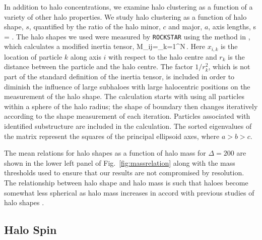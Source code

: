 \documentclass[usenatbib,fleqn]{mnras}
\begin{document}
In addition to halo concentrations, we examine halo clustering as a function of a variety of other halo properties. We study halo clustering as a function of halo shape, $s$, quantified by the ratio of the halo minor, $c$ and major, $a$, axis lengths, 
%
\beq
s = .
\eeq
%
The halo shapes we used were measured by {\tt ROCKSTAR} using the method in \cite{allgood_etal06}, which calculates a modified inertia tensor,
\beq
M_{ij}=\sum\limits_{k=1}^{N}\,.
\eeq
Here $x_{i,k}$ is the location of particle $k$ along axis $i$ with respect to the halo centre and $r_{k}$ is the distance between the particle and the halo centre. The factor $1/r_{k}^2$, which is not part of the standard definition of the inertia tensor, is included in order to diminish the influence of large subhaloes with large halocentric positions on the measurement of the halo shape. The calculation starts with using all particles within a sphere of the halo radius; the shape of boundary then changes iteratively according to the shape measurement of each iteration. Particles associated with identified substructure are included in the calculation. The sorted eigenvalues of the matrix represent the squares of the principal ellipsoid axes, where $a > b > c$. 

The mean relations for halo shapes as a function of halo mass for $\Delta=200$ are shown in the lower left panel of Fig.~\ref{fig:massrelation} along with the mass thresholds used to ensure that our results are not compromised by resolution. The relationship between halo shape and halo mass is such that haloes become somewhat less spherical as halo mass increases in accord with previous studies of halo shapes \citep[e.g.,][]{jing_suto02,allgood_etal06}.

\subsection{Halo Spin}
\end{document}
